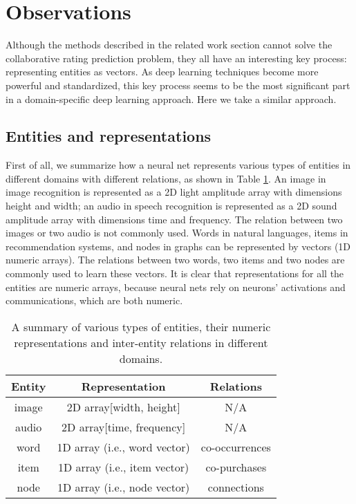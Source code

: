 \documentclass[conference]{IEEEtran}
\begin{document}
\section{Observations}
Although the methods described in the related work section cannot solve the 
collaborative rating prediction problem,
they all have an interesting key process: representing entities as vectors.
As deep learning techniques become more powerful and standardized, this key 
process seems to be the most significant part in a domain-specific deep 
learning approach.
Here we take a similar approach.

\subsection{Entities and representations}
First of all, we summarize how a neural net represents various types of 
entities in different domains with different relations, as shown in 
Table \ref{tab:domains}.
An image in image recognition is represented as a 2D light amplitude 
array with dimensions height and width; an audio in speech recognition 
is represented as a 2D sound amplitude array with dimensions time and 
frequency.
The relation between two images or two audio is not commonly used. 
Words in natural languages, items in recommendation systems, and nodes 
in graphs can be represented by vectors (1D numeric arrays).
The	relations between two words, two items and two nodes are commonly 
used to learn these vectors.
It is clear that representations for all the entities are numeric arrays, 
because neural nets rely on neurons' activations and communications, which 
are both numeric.
\begin{table}[!ht]
	\centering
	\caption{A summary of various types of entities, their numeric
		representations and inter-entity relations in different domains.
	}
	\begin{tabular}{ccc} \hline
		Entity & Representation               & Relations \\ \hline
		image  & 2D array[width, height]      & N/A \\ \hline
		audio  & 2D array[time, frequency]    & N/A \\ \hline
		word   & 1D array (i.e., word vector) & co-occurrences \\ \hline
		item   & 1D array (i.e., item vector) & co-purchases \\ \hline
		node   & 1D array (i.e., node vector) & connections \\ \hline
	\end{tabular}
	\label{tab:domains}
\end{table}
\end{document}
